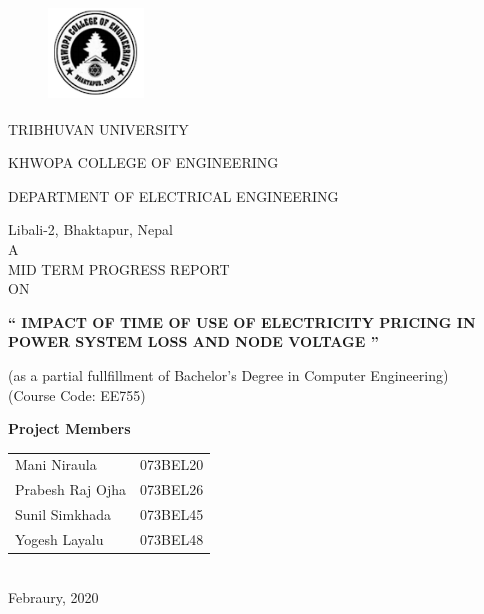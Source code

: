 \documentclass[12pt]{article}
\begin{document}
\begin{titlepage}
\begin{figure}[H]
\centering
\includegraphics[width=1in,height=1in]{KhwopaLogo.PNG}
\end{figure}

\begin{center}
TRIBHUVAN UNIVERSITY\\
\begin{LARGE}
KHWOPA COLLEGE OF ENGINEERING\\
\end{LARGE}
\begin{large}
DEPARTMENT OF ELECTRICAL ENGINEERING\\
\end{large}
\smallskip
Libali-2, Bhaktapur, Nepal\\
\vspace{0.5in}
A\\
MID TERM PROGRESS REPORT\\
ON\\
\begin{LARGE}
\textbf{`` IMPACT OF TIME OF USE OF ELECTRICITY PRICING IN POWER SYSTEM LOSS AND NODE VOLTAGE ''}\\
\end{LARGE}
(as a partial fullfillment of Bachelor's Degree in Computer Engineering)\\
(Course Code: EE755)\\
\vspace{0.5in}		
\begin{large}
\textbf{Project Members}\\
\end{large}
\begin{tabular}{ll}
Mani Niraula & 073BEL20\\
Prabesh Raj Ojha & 073BEL26\\
Sunil Simkhada & 073BEL45\\
Yogesh Layalu & 073BEL48\\
\end{tabular}\\
\vspace{1in}
Febraury, 2020
\end{center}
\end{titlepage}
\end{document}
